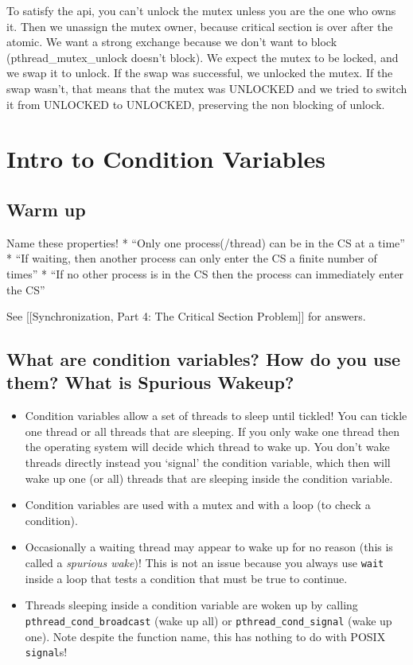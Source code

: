 To satisfy the api, you can't unlock the mutex unless you are the one
who owns it. Then we unassign the mutex owner, because critical section
is over after the atomic. We want a strong exchange because we don't
want to block (pthread\_mutex\_unlock doesn't block). We expect the
mutex to be locked, and we swap it to unlock. If the swap was
successful, we unlocked the mutex. If the swap wasn't, that means that
the mutex was UNLOCKED and we tried to switch it from UNLOCKED to
UNLOCKED, preserving the non blocking of unlock.

\section{Intro to Condition
Variables}\label{intro-to-condition-variables}

\subsection{Warm up}\label{warm-up}

Name these properties! * ``Only one process(/thread) can be in the CS at
a time'' * ``If waiting, then another process can only enter the CS a
finite number of times'' * ``If no other process is in the CS then the
process can immediately enter the CS''

See {[}{[}Synchronization, Part 4: The Critical Section Problem{]}{]}
for answers.

\subsection{What are condition variables? How do you use them? What is
Spurious
Wakeup?}\label{what-are-condition-variables-how-do-you-use-them-what-is-spurious-wakeup}

\begin{itemize}
\item
  Condition variables allow a set of threads to sleep until tickled! You
  can tickle one thread or all threads that are sleeping. If you only
  wake one thread then the operating system will decide which thread to
  wake up. You don't wake threads directly instead you `signal' the
  condition variable, which then will wake up one (or all) threads that
  are sleeping inside the condition variable.
\item
  Condition variables are used with a mutex and with a loop (to check a
  condition).
\item
  Occasionally a waiting thread may appear to wake up for no reason
  (this is called a \emph{spurious wake})! This is not an issue because
  you always use \texttt{wait} inside a loop that tests a condition that
  must be true to continue.
\item
  Threads sleeping inside a condition variable are woken up by calling
  \texttt{pthread\_cond\_broadcast} (wake up all) or
  \texttt{pthread\_cond\_signal} (wake up one). Note despite the
  function name, this has nothing to do with POSIX \texttt{signal}s!
\end{itemize}

